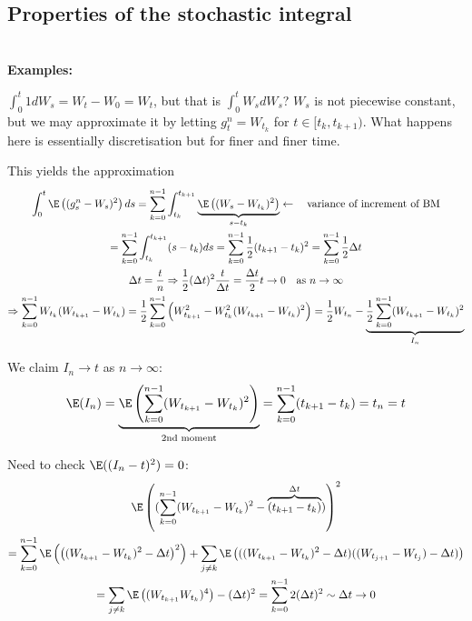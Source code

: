 \subsection{Properties of the stochastic integral}\hfill\\
\noindent\textbf{Examples:}\par
\noindent $\int_{0}^{t}1dW_s = W_t-W_0=W_t$, but that is $\int_{0}^{t}W_sdW_s$? $W_s$ is not piecewise constant, but we may approximate it by letting $g_t^n = W_{t_k}$ for $t\in[t_k,t_{k+1})$. What happens here is essentially discretisation but for finer and finer time.\par
\noindent This yields the approximation
\begin{equation*}
  \begin{gathered}
    \int_{0}^{t}\E\left((g_s^n-W_s)^2\right)ds = \sum_{k=0}^{n-1}\int_{t_k}^{t_{k+1}}\underbrace{\E\left((W_s-W_{t_k})^2\right)}_{s-t_k}\leftarrow\quad\text{variance of increment of BM}\\
    = \sum_{k=0}^{n-1}\int_{t_k}^{t_{k+1}}(s-t_k)ds = \sum_{k=0}^{n-1}\dfrac{1}{2}(t_{k+1}-t_k)^2 = \sum_{k=0}^{n-1}\dfrac{1}{2}\Delta t\\
    \Delta t = \dfrac{t}{n}\Rightarrow \dfrac{1}{2}(\Delta t)^2\dfrac{t}{\Delta t} = \dfrac{\Delta t}{2}t \to0\quad\text{as } n\to\infty\\
    \Rightarrow \sum_{k=0}^{n-1}W_{t_k}(W_{t_{k+1}}-W_{t_k}) = \dfrac{1}{2}\sum_{k=0}^{n-1}\left(W_{t_{k+1}}^2-W_{t_k}^2(W_{t_{k+1}}-W_{t_k})^2\right) = \dfrac{1}{2}W_{t_n}-\underbrace{\dfrac{1}{2}\sum_{k=0}^{n-1}(W_{t_{k+1}}-W_{t_k})^2}_{I_n}
  \end{gathered}
\end{equation*}
\par\bigskip
\noindent We claim $I_n\to t$ as $n\to\infty$:
\begin{equation*}
  \begin{gathered}
    \E(I_n) = \underbrace{\E\left(\sum_{k=0}^{n-1}(W_{t_{k+1}}-W_{t_k})^2\right)}_{\text{2nd moment}} = \sum_{k=0}^{n-1}(t_{k+1}-t_k) = t_n = t
  \end{gathered}
\end{equation*}\par
\noindent Need to check $\E((I_n-t)^2) = 0$:
\begin{equation*}
  \begin{gathered}
    \E\left((\sum_{k=0}^{n-1}(W_{t_{k+1}}-W_{t_k})^2-\overbrace{(t_{k+1}-t_k)}^{\Delta t})\right)^2 \\
    = \sum_{k=0}^{n-1}\E\left(\left((W_{t_{k+1}}-W_{t_k})^2-\Delta t\right)^2\right) +\sum_{j\neq k}\E\left(((W_{t_{k+1}}-W_{t_k})^2-\Delta t)((W_{t_{j+1}}-W_{t_j})-\Delta t)\right)\\
    = \sum_{j\neq k}\E\left((W_{t_{k+1}}W_{t_k})^4\right)-(\Delta t)^2 = \sum_{k=0}^{n-1}2(\Delta t)^2\sim\Delta t \to0
  \end{gathered}
\end{equation*}\par
